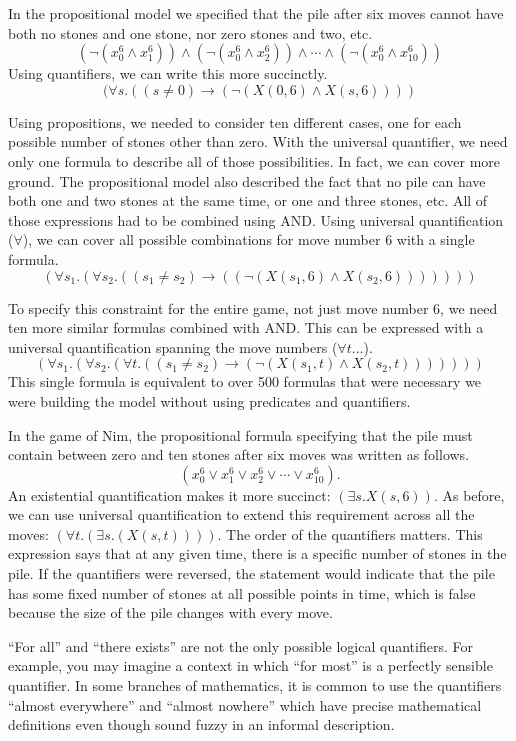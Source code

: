 {{In the propositional model we specified that the pile after six moves
cannot have both no stones and one stone, nor zero stones and two, etc.
$$(\neg(x_{0}^{6} \wedge x_{1}^{6})) \wedge (\neg(x_{0}^{6} \wedge x_{2}^{6})) \wedge \cdots \wedge (\neg(x_{0}^{6} \wedge x_{10}^{6}))$$
Using quantifiers, we can write this more succinctly.
$$(\forall s.((s \neq 0) \rightarrow (\neg(X(0, 6) \wedge X(s, 6))))$$

Using propositions, we needed to consider ten
different cases, one for each possible number of stones other than zero. With the
universal quantifier, we need only one formula to describe all of those
possibilities. In fact, we can cover more ground.
The propositional model also described the fact
that no pile can have both one and two stones at the same time, or one and three
stones, etc.  All of those expressions had to be combined using AND.
Using universal quantification ($\forall$),
we can cover all possible combinations
for move number 6 with a single formula.
$$(\forall s_1.(\forall s_2.((s_1 \ne s_2 ) \rightarrow ((\neg(X(s_1, 6) \wedge X(s_2, 6)))))))$$

To specify this constraint for the entire game, not just move number 6,
we need ten more similar formulas combined with AND.
This can be expressed with a universal quantification spanning the move numbers ($\forall t \dots$).
$$(\forall s_1.(\forall s_2.(\forall t.((s_1 \ne s_2) \rightarrow (\neg(X(s_1, t) \wedge X(s_2, t)))))))$$
This single formula is equivalent to over 500 formulas that were
necessary we were building the model without using predicates and quantifiers.

In the game of Nim, the propositional formula specifying that the pile must contain between zero and
ten stones after six moves was written as follows.
$$(x_{0}^{6} \vee x_{1}^{6} \vee x_{2}^{6} \vee \cdots \vee x_{10}^{6}).$$
An existential quantification makes it more succinct: $(\exists s.X(s, 6))$.
As before, we can use universal quantification to extend this requirement
across all the moves:
$(\forall t.(\exists s.(X(s, t))))$.
The order of the quantifiers matters. This expression says that at any given
time, there is a specific number of stones in the pile. If the quantifiers were reversed,
the statement would indicate that the pile has some fixed number of stones
at all possible points in time, which is false because the size of the pile
changes with every move.

\begin{aside}
``For all'' and ``there exists'' are not the only possible logical quantifiers.
For example, you may imagine a context
in which ``for most'' is a perfectly sensible quantifier.
In some branches of mathematics, it is common to use the
quantifiers ``almost everywhere'' and ``almost nowhere''
which have precise mathematical definitions even though
sound fuzzy in an informal description.
\end{aside}

}}
